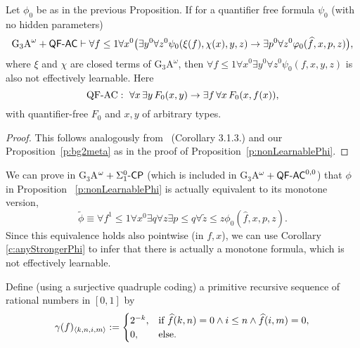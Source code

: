\begin{cor}\label{c:anyStrongerPhi}
Let $\phi_0$ be as in the previous Proposition. If for a quantifier free formula $\psi_0$ (with no hidden parameters)
\[
\mbox{\rm G$_3$A}^\omega+\textsf{\upshape QF}\textsf{\upshape -}\textsf{\upshape AC} 
\vdash \forall f\leq 1 \forall x^0\big( \exists y^0\forall z^0 \psi_0(\xi(f),\chi(x),y,z)
 \rightarrow \exists p^0\forall z^0 \varphi_0(\widehat{f},x,p,z) \big),
\]
where $\xi$ and $\chi$ are closed terms of {\rm G$_3$A$^\omega$,}
then $\forall f\leq 1\forall x^0\exists y^0\forall z^0 \psi_0(f,x,y,z)$ is also not effectively learnable. Here 
\[ \mbox{\rm QF-AC}: \ \forall x\,\exists y\,F_0(x,y)\rightarrow 
\exists f\,\forall x\,F_0(x,f(x)), \] 
with quantifier-free $F_0$ and $x,y$ of arbitrary types.
\end{cor}
\begin{proof}
This follows analogously from~\cite{Kohlenbach(lowrate)} (Corollary 3.1.3.) 
and our Proposition~\ref{p:bg2meta} as in the proof
of Proposition~\ref{p:nonLearnablePhi}.
\end{proof}

\begin{rmk}
We can prove in {\rm G$_3$A$^\omega+\Sigma^0_1\textsf{\upshape -}\textsf{\upshape CP}$} (which is included in 
{\rm G$_3$A$^\omega+\textsf{\upshape QF}\textsf{\upshape -}\textsf{\upshape AC}^{0,0}$}) that $\phi$ in Proposition
~\ref{p:nonLearnablePhi} is actually equivalent to its monotone version, 
\[
\tilde\phi\equiv \forall f^1\leq 1\forall x^0\exists q\forall z \exists 
p\leq q\forall \tilde z\leq z \phi_0(\widehat{f},x,p,z).
\]
Since this equivalence holds also pointwise (in $f,x$), 
we can use Corollary \ref{c:anyStrongerPhi} to 
infer that there is actually a monotone formula, which is not effectively 
learnable.
\end{rmk}

\begin{dfn}\label{d:gammaf} Define (using a surjective quadruple coding) a 
primitive recursive sequence of rational numbers in $[0,1]$ by
\[
\gamma(f)_{\langle k,n,i,m\rangle}:=\begin{cases}
2^{-k},&\text{if}\ \widehat{f}(k,n)=0\wedge i\leq n\wedge \widehat{f}(i,m)=0,\\
0,&\text{else}.\end{cases}
\]
\end{dfn}

